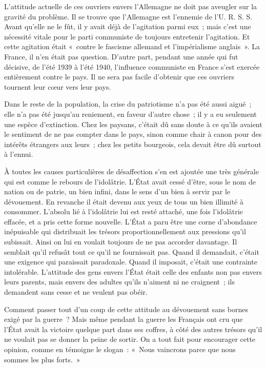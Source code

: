 \documentclass[french,twoside]{book} %
\begin{document}
L'attitude actuelle de ces ouvriers envers l'Allemagne ne doit pas aveugler sur la gravité du problème. Il se trouve que l'Allemagne est l’ennemie de l’U. R. S. S. Avant qu'elle ne le fût, il y avait déjà de l'agitation parmi eux ; mais c'est une nécessité vitale pour le parti communiste de toujours entretenir l'agitation. Et cette agitation était « contre le fascisme allemand et l'impérialisme anglais ». La France, il n'en était pas question. D'autre part, pendant une année qui fut décisive, de l’été 1939 à l'été 1940, l'influence communiste en France s'est exercée entièrement contre le pays. Il ne sera pas facile d'obtenir que ces ouvriers tournent leur cœur vers leur pays.\par
Dans le reste de la population, la crise du patriotisme n'a pas été aussi aiguë ; elle n'a pas été jusqu'au reniement, en faveur d'autre chose ; il y a eu seulement une espèce d'extinction. Chez les paysans, c'était dû sans doute à ce qu'ils avaient le sentiment de ne pas compter dans le pays, sinon comme chair à canon pour des intérêts étrangers aux leurs ; chez les petits bourgeois, cela devait être dû surtout à l'ennui.\par
À toutes les causes particulières de désaffection s'en est ajoutée une très générale qui est comme le rebours de l'idolâtrie. L'État avait cessé d'être, sous le nom de nation ou de patrie, un bien infini, dans le sens d'un bien à servir par le dévouement. En revanche il était devenu aux yeux de tous un bien illimité à consommer. L'absolu lié à l'idolâtrie lui est resté attaché, une fois l'idolâtrie effacée, et a pris cette forme nouvelle. L'État a paru être une corne d'abondance inépuisable qui distribuait les trésors proportionnellement aux pressions qu'il subissait. Ainsi on lui en voulait toujours de ne pas accorder davantage. Il semblait qu'il refusât tout ce qu'il ne fournissait pas. Quand il demandait, c'était une exigence qui paraissait paradoxale. Quand il imposait, c'était une contrainte intolérable. L'attitude des gens envers l'État était celle des enfants non pas envers leurs parents, mais envers des adultes qu'ils n'aiment ni ne craignent ; ils demandent sans cesse et ne veulent pas obéir.\par
Comment passer tout d'un coup de cette attitude au dévouement sans bornes exigé par la guerre ? Mais même pendant la guerre les Français ont cru que l'État avait la victoire quelque part dans ses coffres, à côté des autres trésors qu'il ne voulait pas se donner la peine de sortir. On a tout fait pour encourager cette opinion, comme en témoigne le slogan : « Nous vaincrons parce que nous sommes les plus forts. »\par
\end{document}
